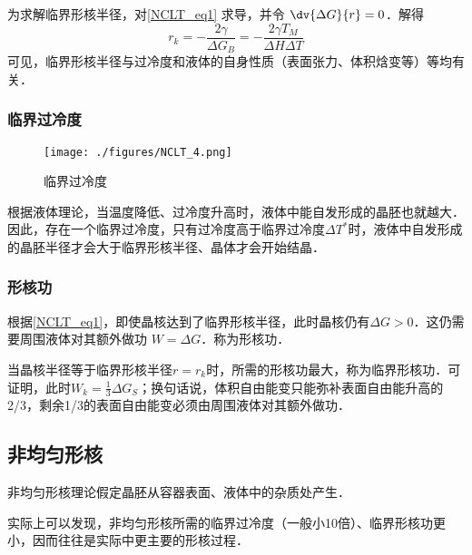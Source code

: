 为求解临界形核半径，对\autoref{NCLT_eq1} 求导，并令 $\dv{\Delta G}{r} = 0$．解得
\begin{equation}
r_k=-\frac{2\gamma}{\Delta G_B}=-\frac{2\gamma T_M}{\Delta H \Delta T}
\end{equation}
可见，临界形核半径与过冷度和液体的自身性质（表面张力、体积焓变等）等均有关．

\subsubsection{临界过冷度}

\begin{figure}[ht]
\centering
\texttt{[image: ./figures/NCLT\_4.png]}
\caption{临界过冷度} \label{NCLT_fig4}
\end{figure}
根据液体理论，当温度降低、过冷度升高时，液体中能自发形成的晶胚也就越大．因此，存在一个临界过冷度，只有过冷度高于临界过冷度$\Delta T^*$时，液体中自发形成的晶胚半径才会大于临界形核半径、晶体才会开始结晶．

\subsubsection{形核功}
根据\autoref{NCLT_eq1}，即使晶核达到了临界形核半径，此时晶核仍有$\Delta G>0$．这仍需要周围液体对其额外做功 $W=\Delta G$．称为形核功．

当晶核半径等于临界形核半径$r=r_k$时，所需的形核功最大，称为临界形核功．可证明，此时$W_k=\frac{1}{3}\Delta G_S$；换句话说，体积自由能变只能弥补表面自由能升高的2/3，剩余1/3的表面自由能变必须由周围液体对其额外做功．

\subsection{非均匀形核}
非均匀形核理论假定晶胚从容器表面、液体中的杂质处产生．

实际上可以发现，非均匀形核所需的临界过冷度（一般小10倍）、临界形核功更小，因而往往是实际中更主要的形核过程．

